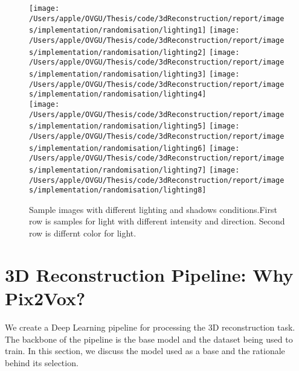\begin{figure}[ht]
    \centering
    \texttt{[image: /Users/apple/OVGU/Thesis/code/3dReconstruction/report/images/implementation/randomisation/lighting1]}
    \texttt{[image: /Users/apple/OVGU/Thesis/code/3dReconstruction/report/images/implementation/randomisation/lighting2]}
    \texttt{[image: /Users/apple/OVGU/Thesis/code/3dReconstruction/report/images/implementation/randomisation/lighting3]}
    \texttt{[image: /Users/apple/OVGU/Thesis/code/3dReconstruction/report/images/implementation/randomisation/lighting4]}\\
    \vspace{0.1cm}
    \texttt{[image: /Users/apple/OVGU/Thesis/code/3dReconstruction/report/images/implementation/randomisation/lighting5]}
    \texttt{[image: /Users/apple/OVGU/Thesis/code/3dReconstruction/report/images/implementation/randomisation/lighting6]}
    \texttt{[image: /Users/apple/OVGU/Thesis/code/3dReconstruction/report/images/implementation/randomisation/lighting7]}
    \texttt{[image: /Users/apple/OVGU/Thesis/code/3dReconstruction/report/images/implementation/randomisation/lighting8]}\\
    \caption[Samples for Lightings and Shadows.]{Sample images with different lighting and shadows conditions.First row is samples for light with different intensity and direction. Second row is differnt color for light.}
    \label{fig:Lighting and shadows}
\end{figure}

\section{3D Reconstruction Pipeline: Why Pix2Vox?}\label{sec:3D reconstruction pipeline}
We create a Deep Learning pipeline for processing the 3D reconstruction task.
The backbone of the pipeline is the base model and the dataset being used to train.
In this section, we discuss the model used as a base and the rationale behind its selection.

